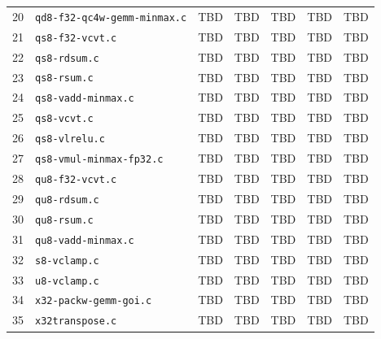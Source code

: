 {\begin{longtable}{@{}rlcrrrr@{}}
20 & \texttt{qd8-f32-qc4w-gemm-minmax.c} & TBD & TBD & TBD & TBD & TBD \\
21 & \texttt{qs8-f32-vcvt.c} & TBD & TBD & TBD & TBD & TBD \\
22 & \texttt{qs8-rdsum.c} & TBD & TBD & TBD & TBD & TBD \\
23 & \texttt{qs8-rsum.c} & TBD & TBD & TBD & TBD & TBD \\
24 & \texttt{qs8-vadd-minmax.c} & TBD & TBD & TBD & TBD & TBD \\
25 & \texttt{qs8-vcvt.c} & TBD & TBD & TBD & TBD & TBD \\
26 & \texttt{qs8-vlrelu.c} & TBD & TBD & TBD & TBD & TBD \\
27 & \texttt{qs8-vmul-minmax-fp32.c} & TBD & TBD & TBD & TBD & TBD \\
28 & \texttt{qu8-f32-vcvt.c} & TBD & TBD & TBD & TBD & TBD \\
29 & \texttt{qu8-rdsum.c} & TBD & TBD & TBD & TBD & TBD \\
30 & \texttt{qu8-rsum.c} & TBD & TBD & TBD & TBD & TBD \\
31 & \texttt{qu8-vadd-minmax.c} & TBD & TBD & TBD & TBD & TBD \\
32 & \texttt{s8-vclamp.c} & TBD & TBD & TBD & TBD & TBD \\
33 & \texttt{u8-vclamp.c} & TBD & TBD & TBD & TBD & TBD \\
34 & \texttt{x32-packw-gemm-goi.c} & TBD & TBD & TBD & TBD & TBD \\
35 & \texttt{x32transpose.c} & TBD & TBD & TBD & TBD & TBD \\
\end{longtable}
}
